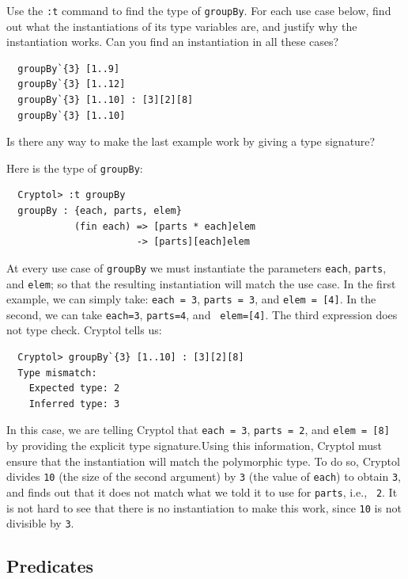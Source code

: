 \begin{Exercise}\label{ex:poly:groupBy}\indGroup
  Use the {\tt :t} command to find the type of {\tt groupBy}. For each
  use case below, find out what the instantiations of its type
  variables are, and justify why the instantiation works. Can you find
  an instantiation in all these cases?
\begin{Verbatim}
  groupBy`{3} [1..9]
  groupBy`{3} [1..12]
  groupBy`{3} [1..10] : [3][2][8]
  groupBy`{3} [1..10]
\end{Verbatim}
Is there any way to make the last example work by giving a type signature?
\end{Exercise}
\begin{Answer}\indGroup
Here is the type of {\tt groupBy}:
\begin{Verbatim}
  Cryptol> :t groupBy
  groupBy : {each, parts, elem} 
            (fin each) => [parts * each]elem 
                       -> [parts][each]elem
\end{Verbatim}
At every use case of {\tt groupBy} we must instantiate the parameters
{\tt each}, {\tt parts}, and {\tt elem}; so that the resulting
instantiation will match the use case.  In the first example, we can
simply take: {\tt each = 3}, {\tt parts = 3}, and {\tt elem = [4]}. In
the second, we can take {\tt each=3}, {\tt parts=4}, and {\tt
  elem=[4]}. The third expression does not type check. Cryptol tells
us:
\begin{Verbatim}
  Cryptol> groupBy`{3} [1..10] : [3][2][8]
  Type mismatch:
    Expected type: 2
    Inferred type: 3
\end{Verbatim}
In this case, we are telling Cryptol that {\tt each = 3}, {\tt parts =
  2}, and {\tt elem = [8]} by providing the explicit type
signature.\indSignature Using this information, Cryptol must ensure
that the instantiation will match the polymorphic type. To do so,
Cryptol divides {\tt 10} (the size of the second argument) by {\tt 3}
(the value of {\tt each}) to obtain {\tt 3}, and finds out that it
does not match what we told it to use for {\tt parts}, i.e., {\tt
  2}. It is not hard to see that there is no instantiation to make this
work, since {\tt 10} is not divisible by {\tt 3}.
\end{Answer}

\subsection{Predicates}
\label{sec:predicates}

